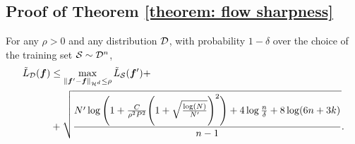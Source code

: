 \subsection{Proof of Theorem \ref{theorem: flow sharpness}}
\label{proof: flow sharpness}

\begin{theorem} 
For any $\rho > 0$ and any distribution ${\mathcal{D}}$, with probability $1 - \delta$ over the choice of the training set ${\mathcal{S}} \sim {\mathcal{D}}^n$, 
\begin{align*}
     \Tilde{L}_{\mathcal{D}} ({\bm{f}}) &\leq \max_{\|{\bm{f}}' - {\bm{f}}\|_{{\mathcal{H}}^d} \leq \rho}\Tilde{L}_{\mathcal{S}}({\bm{f}}') + \\
         &+ \sqrt{\frac{N' \log \Bigg(1 + \frac{C}{\rho^2 P^2}\Bigg(1+ \sqrt{\frac{\log(N)}{N'}}\Bigg)^2 \Bigg)+4\log\frac{n}{\delta}+8\log(6n+3k)}{n-1}}.\\
\end{align*}
\end{theorem}

